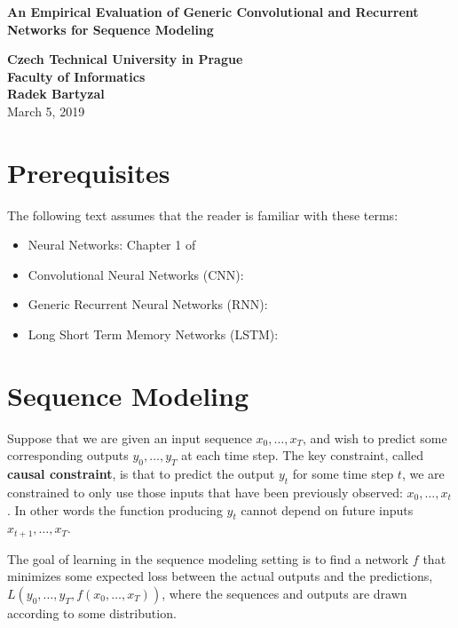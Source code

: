 \documentclass[12pt, titlepage]{article}
\author{Radek Bartyzal}
\begin{document}
\begin{titlepage}
    \centering
    \vfill
    {\bfseries\Huge
        An Empirical Evaluation of Generic Convolutional and Recurrent Networks for Sequence Modeling \\
    }    
        \vskip1cm
        
    {\bfseries\Large 
    Czech Technical University in Prague\\ 
    Faculty of Informatics\\ 
    \vskip1cm
    Radek Bartyzal\\
    }    
    \vskip1cm
    March 5, 2019
    \vfill

    \vfill
    \vfill
\end{titlepage}

\tableofcontents

\section{Prerequisites}
The following text assumes that the reader is familiar with these terms:

\begin{itemize}
\item Neural Networks: Chapter 1 of \cite{cit:nn} 
\item Convolutional Neural Networks (CNN): \cite{cit:cnn}
\item Generic Recurrent Neural Networks (RNN): \cite{cit:lstm}
\item Long Short Term Memory Networks (LSTM): \cite{cit:lstm}
\end{itemize}

\section{Sequence Modeling}\label{sec:seq}
Suppose that we are given an input sequence $x_0, \dots , x_T$, and wish to predict some corresponding outputs $y_0, \dots , y_T$ at each time step. The key constraint, called \textbf{causal constraint}, is that to predict the output $y_t$ for some time step $t$, we are constrained to only use those inputs that have been previously observed: $x_0, \dots , x_t$. In other words the function producing $y_t$ cannot depend on future inputs $x_{t+1}, \dots, x_T.$


The goal of learning in the sequence modeling setting is to find a network $f$ that minimizes some expected loss between the actual outputs and the predictions, $L(y_0, \dots , y_T, f(x_0, \dots , x_T))$, where the sequences and outputs are drawn according to some distribution.
\end{document}
